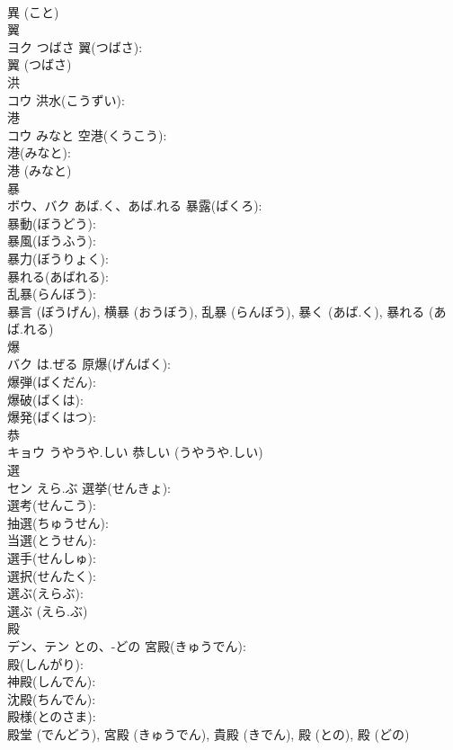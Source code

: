 \documentclass[8pt]{extreport}
\begin{document}
\begin{CJK}{UTF8}{min}
\\	異 (こと)
\\	翼			
\\	ヨク	つばさ	翼(つばさ): 
\\	翼 (つばさ)
\\	洪			
\\	コウ		洪水(こうずい): 
\\	港			
\\	コウ	みなと	空港(くうこう): 
\\	港(みなと): 
\\	港 (みなと)
\\	暴			
\\	ボウ、バク	あば.く、あば.れる	暴露(ばくろ): 
\\	暴動(ぼうどう): 
\\	暴風(ぼうふう): 
\\	暴力(ぼうりょく): 
\\	暴れる(あばれる): 
\\	乱暴(らんぼう): 
\\	暴言 (ぼうげん), 横暴 (おうぼう), 乱暴 (らんぼう), 暴く (あば.く), 暴れる (あば.れる)
\\	爆			
\\	バク	は.ぜる	原爆(げんばく): 
\\	爆弾(ばくだん): 
\\	爆破(ばくは): 
\\	爆発(ばくはつ): 
\\	恭			
\\	キョウ	うやうや.しい		恭しい (うやうや.しい)
\\	選			
\\	セン	えら.ぶ	選挙(せんきょ): 
\\	選考(せんこう): 
\\	抽選(ちゅうせん): 
\\	当選(とうせん): 
\\	選手(せんしゅ): 
\\	選択(せんたく): 
\\	選ぶ(えらぶ): 
\\	選ぶ (えら.ぶ)
\\	殿			
\\	デン、テン	との、-どの	宮殿(きゅうでん): 
\\	殿(しんがり): 
\\	神殿(しんでん): 
\\	沈殿(ちんでん): 
\\	殿様(とのさま): 
\\	殿堂 (でんどう), 宮殿 (きゅうでん), 貴殿 (きでん), 殿 (との), 殿 (どの)

\end{CJK}
\end{document}
